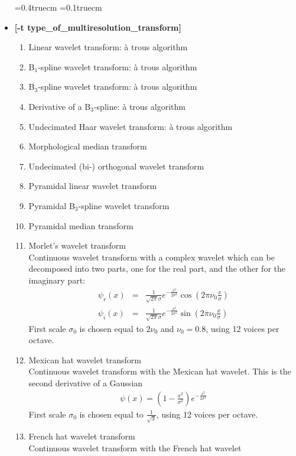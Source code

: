 \begin{itemize}
\baselineskip=0.4truecm
\itemsep=0.1truecm
\item {\bf [-t type\_of\_multiresolution\_transform]}
\begin{enumerate}
\baselineskip=0.4truecm
\itemsep=0.1truecm
\item Linear wavelet transform: \`a trous algorithm 
\item B$_1$-spline wavelet transform: \`a trous algorithm 
\item B$_3$-spline wavelet transform: \`a trous algorithm 
\item Derivative of a B$_3$-spline: \`a trous algorithm 
\item Undecimated Haar wavelet transform: \`a trous algorithm
\item Morphological median transform 
\item Undecimated (bi-) orthogonal wavelet transform 
\item Pyramidal linear wavelet transform 
\item Pyramidal B$_3$-spline wavelet transform 
\item Pyramidal median transform 
\item Morlet's wavelet transform \\
Continuous wavelet transform with a complex wavelet 
which can be decomposed into two parts, one for
the real part, and the other for the imaginary part:
\begin{eqnarray*}
\psi_r(x) & = & \frac{1}{\sqrt{2 \pi}\sigma}  e^{-\frac{x^2}{2\sigma^2}} \cos(2\pi\nu_0 \frac{x}{\sigma}) \nonumber \\
\psi_i(x) & = & \frac{1}{\sqrt{2 \pi}\sigma}  e^{-\frac{x^2}{2\sigma^2}} \sin(2\pi\nu_0 \frac{x}{\sigma}) 
\end{eqnarray*}
First scale $\sigma_0$ is chosen equal to $2 \nu_0$ and $\nu_0 = 0.8$, 
using 12 voices per octave.
\item Mexican hat wavelet transform \\
Continuous wavelet transform with the Mexican hat wavelet.
This is the second derivative of a Gaussian
\begin{eqnarray}
\psi(x) = (1 - \frac{x^2}{\sigma^2}) e^{-\frac{ x^2}{2\sigma^2}} 
\end{eqnarray}
First scale $\sigma_0$ is chosen equal to $\frac{1}{\sqrt{3}}$, using 12 voices per octave.
\item French hat wavelet transform \\
Continuous wavelet transform with the French  hat wavelet

\end{enumerate}
\end{itemize}
